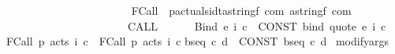\begin{isabellebody}
\ \ \ \ \ \ \ \ \ \ \ {\isacharparenleft}{\isachardoublequoteopen}{\isacharunderscore}{\isasymggreater}{\isacharslash}\ {\isacharunderscore}{\isachardoublequoteclose}\ {\isacharbrackleft}{}{}{\isacharcomma}\ {}{}{\isacharbrackright}\ {}{}{\isacharparenright}\isanewline
\ \ \ \ \ \ \ {\isachardoublequoteopen}{\isacharunderscore}FCall{\isachardoublequoteclose}\ {\isacharcolon}{\isacharcolon}\ {\isachardoublequoteopen}{\isacharbrackleft}{\isacharprime}p{\isacharcomma}actuals{\isacharcomma}idt{\isacharcomma}{\isacharparenleft}{\isacharparenleft}{\isacharprime}a{\isacharcomma}string{\isacharcomma}{\isacharprime}f{\isacharparenright}\ com{\isacharparenright}{\isacharbrackright}{\isasymRightarrow}\ {\isacharparenleft}{\isacharparenleft}{\isacharprime}a{\isacharcomma}string{\isacharcomma}{\isacharprime}f{\isacharparenright}\ com{\isacharparenright}{\isachardoublequoteclose}\ \isanewline
\ \ \ \ \ \ \ \ \ \ \ \ \ \ \ \ \ \ \ \ \ \ {\isacharparenleft}{\isachardoublequoteopen}CALL\ {\isacharunderscore}{\isacharunderscore}\ {\isasymggreater}\ {\isacharunderscore}{\isachardot}{\isacharslash}\ {\isacharunderscore}{\isachardoublequoteclose}\ {\isacharbrackleft}{}{}{}{}{\isacharcomma}{}{}{}{}{\isacharcomma}{}{}{}{}{\isacharcomma}{}{}{\isacharbrackright}\ {}{}{\isacharparenright}\isanewline
\isanewline
\isanewline
\isanewline
{}\isamarkupfalse%
\isanewline
{\isachardoublequoteopen}{\isacharunderscore}Bind\ e\ i\ c{\isachardoublequoteclose}\ {\isacharequal}{\isacharequal}\ {\isachardoublequoteopen}CONST\ bind\ {\isacharparenleft}{\isacharunderscore}quote\ e{\isacharparenright}\ {\isacharparenleft}{\isasymlambda}i{\isachardot}\ c{\isacharparenright}{\isachardoublequoteclose}\isanewline
{\isachardoublequoteopen}{\isacharunderscore}FCall\ p\ acts\ i\ c{\isachardoublequoteclose}\ {\isacharequal}{\isacharequal}\ {\isachardoublequoteopen}{\isacharunderscore}FCall\ p\ acts\ {\isacharparenleft}{\isasymlambda}i{\isachardot}\ c{\isacharparenright}{\isachardoublequoteclose}\isanewline
{\isachardoublequoteopen}{\isacharunderscore}bseq\ c\ d{\isachardoublequoteclose}\ {\isacharequal}{\isacharequal}\ {\isachardoublequoteopen}CONST\ bseq\ c\ d{\isachardoublequoteclose}\isanewline
\isanewline
\isanewline
\isanewline
{}\isamarkupfalse%
\ modifyargs\isanewline
\isanewline
{}\isamarkupfalse%

\end{isabellebody}
